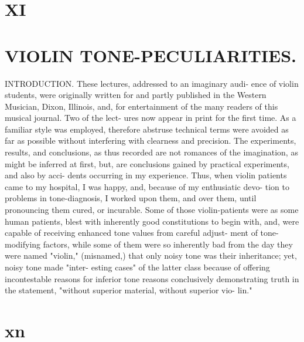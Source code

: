 \documentclass{article}
\begin{document}
\section*{XI}
\section*{VIOLIN TONE-PECULIARITIES.}
INTRODUCTION. These lectures, addressed to an imaginary audi- ence of violin students, were originally written for and partly published in the Western Musician, Dixon, Illinois, and, for entertainment of the many readers of this musical journal. Two of the lect- ures now appear in print for the first time. As a familiar style was employed, therefore abstruse technical terms were avoided as far as possible without interfering with clearness and precision. The experiments, results, and conclusions, as thus recorded are not romances of the imagination, as might be inferred at first, but, are conclusions gained by practical experiments, and also by acci- dents occurring in my experience. Thus, when violin patients came to my hospital, I was happy, and, because of my enthusiatic devo- tion to problems in tone-diagnosis, I worked upon them, and over them, until pronouncing them cured, or incurable. Some of those violin-patients were as some human patients, blest with inherently good constitutions to begin with, and, were capable of receiving enhanced tone values from careful adjust- ment of tone-modifying factors, while some of them were so inherently bad from the day they were named "violin," (misnamed,) that only noisy tone was their inheritance; yet, noisy tone made "inter- esting cases" of the latter class because of offering incontestable reasons for inferior tone reasons conclusively demonstrating truth in the statement, "without superior material, without superior vio- lin."

\section*{xn}
\end{document}
